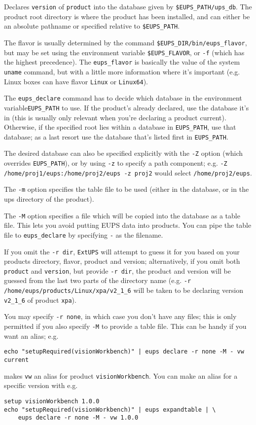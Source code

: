\documentclass{article}
\newcommand{\code}[1]{\texttt{#1}}
\newcommand{\eups}{\code{ExtUPS}}
\begin{document}
\begin{itemize}
Declares \code{version} of \code{product} into the database given by \code{\$EUPS\_PATH/ups\_db}.
The product root directory is where the product has been installed, and can either
be an absolute pathname or specified relative to \code{\$EUPS\_PATH}.

The flavor is usually determined by the command \code{\$EUPS\_DIR/bin/eups\_flavor},
but may be set using the
environment variable \code{\$EUPS\_FLAVOR}, or \code{-f} (which has the highest
precedence).  The \code{eups\_flavor} is basically the value of the system \code{uname}
command, but with a little more information where it's important (e.g. Linux boxes
can have flavor \code{Linux} or \code{Linux64}).

The \code{eups\_declare} command has to decide which database in the environment
variable\code{EUPS\_PATH}
to use.  If the product's already declared, use the database it's in (this is usually
only relevant when you're declaring a product current).  Otherwise, if the specified root
lies within a database in \code{EUPS\_PATH}, use that database; as a last resort use
the database that's listed first in \code{EUPS\_PATH}.

The desired database can also be specified
explicitly with the \code{-Z} option (which overrides \code{EUPS\_PATH}), or by using \code{-z}
to specify a path component; e.g.
\code{-Z /home/proj1/eups:/home/proj2/eups -z proj2} would select \code{/home/proj2/eups}.

The \code{-m} option specifies the table
file to be used (either in the database, or in the ups directory of the product).

The \code{-M} option specifies a file which will be copied into the
database as a table file. This lets you avoid putting EUPS data
into products. You can pipe the table file to \code{eups\_declare} by
specifying \code{-} as the filename.

If you omit the \code{-r dir}, \eups{} will attempt to guess it for you based
on your products directory, flavor, product and version; alternatively,
if you omit both \code{product} and \code{version}, but provide \code{-r dir},
the product and version will be guessed from the last two parts of the directory
name (e.g. \code{-r /home/eups/products/Linux/xpa/v2\_1\_6} will be taken to be
declaring version \code{v2\_1\_6} of product \code{xpa}).

You may specify \code{-r none}, in which case you don't have any files; this
is only permitted if you also specify \code{-M} to provide a table file.  This
can be handy if you want an alias; e.g.
\begin{verbatim}
echo "setupRequired(visionWorkbench)" | eups declare -r none -M - vw current
\end{verbatim}
makes \code{vw} an alias for product \code{visionWorkbench}. You can make
an alias for a specific version with e.g.
\begin{verbatim}
setup visionWorkbench 1.0.0
echo "setupRequired(visionWorkbench)" | eups expandtable | \
	eups declare -r none -M - vw 1.0.0
\end{verbatim}



\end{itemize}
\end{document}
